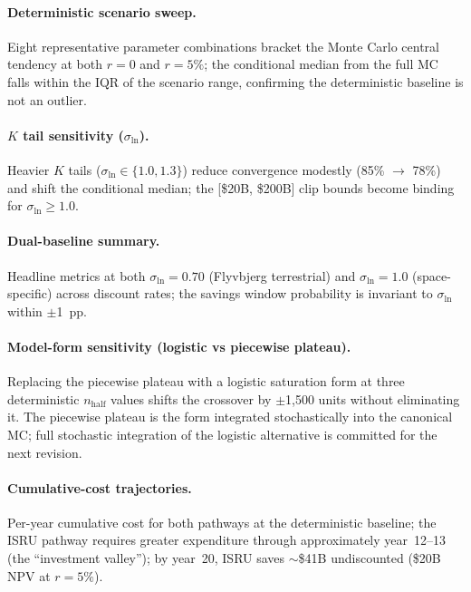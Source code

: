 

\paragraph{Deterministic scenario sweep.} Eight representative parameter combinations bracket the Monte Carlo central tendency at both $r = 0$ and $r = 5\%$; the conditional median from the full MC falls within the IQR of the scenario range, confirming the deterministic baseline is not an outlier.



\paragraph{$K$ tail sensitivity ($\sigma_{\ln}$).} Heavier $K$ tails ($\sigma_{\ln} \in \{1.0, 1.3\}$) reduce convergence modestly (85\% $\to$ 78\%) and shift the conditional median; the [\$20B, \$200B] clip bounds become binding for $\sigma_{\ln} \geq 1.0$.



\paragraph{Dual-baseline summary.} Headline metrics at both $\sigma_{\ln} = 0.70$ (Flyvbjerg terrestrial) and $\sigma_{\ln} = 1.0$ (space-specific) across discount rates; the savings window probability is invariant to $\sigma_{\ln}$ within $\pm$1~pp.



\paragraph{Model-form sensitivity (logistic vs piecewise plateau).} Replacing the piecewise plateau with a logistic saturation form at three deterministic $n_{\mathrm{half}}$ values shifts the crossover by $\pm$1{,}500 units without eliminating it. The piecewise plateau is the form integrated stochastically into the canonical MC; full stochastic integration of the logistic alternative is committed for the next revision.



\paragraph{Cumulative-cost trajectories.} Per-year cumulative cost for both pathways at the deterministic baseline; the ISRU pathway requires greater expenditure through approximately year~12--13 (the ``investment valley''); by year~20, ISRU saves $\sim$\$41B undiscounted (\$20B NPV at $r = 5\%$).




